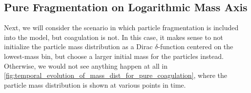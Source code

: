 
    \cleardoublepage\subsection{Pure Fragmentation on Logarithmic Mass Axis}
    \label{sec:pure_fragmentation_on_log_mass_axis}

        Next, we will consider the scenario in which particle fragmentation is included into 
        the model, but coagulation is not. In this case, it makes sense to not initialize the 
        particle mass distribution as a Dirac $\delta$-function centered on the lowest-mass 
        bin, but choose a larger initial mass for the particles instead.
        Otherwise, we would not see anything happen at all in 
        \cref{fig:temporal_evolution_of_mass_dist_for_pure_coagulation}, where the particle 
        mass distribution is shown at various points in time. \\

